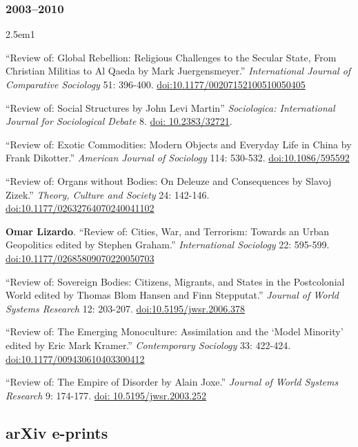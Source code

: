 \documentclass[
]{article}
\newenvironment{cventry}{\begin{hangparas}{2.5em}{1}}{\end{hangparas}}
\begin{document}
\subsubsection{2003--2010}\label{section-21}

\begin{cventry}

``Review of: Global Rebellion: Religious Challenges to the Secular
State, From Christian Militias to Al Qaeda by Mark Juergensmeyer.''
\emph{International Journal of Comparative Sociology} 51: 396-400.
\href{https://doi.org/10.1177/00207152100510050405}{doi:10.1177/00207152100510050405}

``Review of: Social Structures by John Levi Martin'' \emph{Sociologica:
International Journal for Sociological Debate} 8.
\href{http://www.rivisteweb.it/doi/10.2383/32721}{doi: 10.2383/32721}.

``Review of: Exotic Commodities: Modern Objects and Everyday Life in
China by Frank Dikotter.'' \emph{American Journal of Sociology} 114:
530-532. \href{https://doi.org/10.1086/595592}{doi:10.1086/595592}

``Review of: Organs without Bodies: On Deleuze and Consequences by
Slavoj Zizek.'' \emph{Theory, Culture and Society} 24: 142-146.
\href{https://doi.org/10.1177/02632764070240041102}{doi:10.1177/02632764070240041102}

\textbf{Omar Lizardo}. ``Review of: Cities, War, and Terrorism: Towards
an Urban Geopolitics edited by Stephen Graham.'' \emph{International
Sociology} 22: 595-599.
\href{https://doi.org/10.1177/02685809070220050703}{doi:10.1177/02685809070220050703}

``Review of: Sovereign Bodies: Citizens, Migrants, and States in the
Postcolonial World edited by Thomas Blom Hansen and Finn Stepputat.''
\emph{Journal of World Systems Research} 12: 203-207.
\href{https://doi.org/10.5195/jwsr.2006.378}{doi:10.5195/jwsr.2006.378}

``Review of: The Emerging Monoculture: Assimilation and the `Model
Minority' edited by Eric Mark Kramer.'' \emph{Contemporary Sociology}
33: 422-424.
\href{https://doi.org/10.1177/009430610403300412}{doi:10.1177/009430610403300412}

``Review of: The Empire of Disorder by Alain Joxe.'' \emph{Journal of
World Systems Research} 9: 174-177.
\href{https://doi.org/10.5195/jwsr.2003.252}{doi: 10.5195/jwsr.2003.252}

\end{cventry}

\subsection{arXiv e-prints}\label{arxiv-e-prints}
\end{document}
